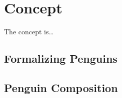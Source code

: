 \setchaptertoc
\chapter{Concept}\label{chp:concept}

\begin{summary}
The concept is\ldots
\end{summary}

\section{Formalizing Penguins}

\section{Penguin Composition}